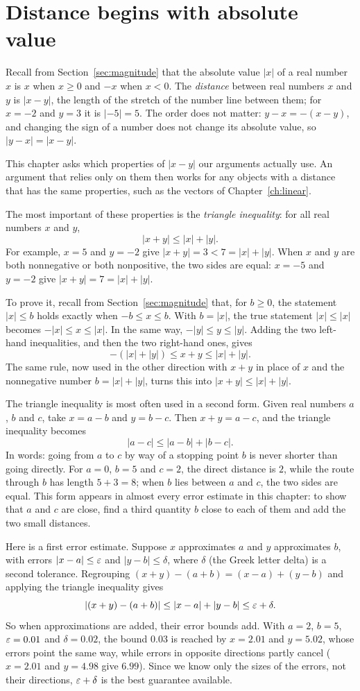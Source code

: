 \section{Distance begins with absolute value}\label{ch11:sec:distance}
Recall from Section~\ref{sec:magnitude} that the absolute value $|x|$ of a real number $x$ is $x$ when $x\ge0$ and $-x$ when $x<0$. The \emph{distance} between real numbers $x$ and $y$ is $|x-y|$, the length of the stretch of the number line between them; for $x=-2$ and $y=3$ it is $|-5|=5$. The order does not matter: $y-x=-(x-y)$, and changing the sign of a number does not change its absolute value, so $|y-x|=|x-y|$.

This chapter asks which properties of $|x-y|$ our arguments actually use. An argument that relies only on them then works for any objects with a distance that has the same properties, such as the vectors of Chapter~\ref{ch:linear}.

The most important of these properties is the \emph{triangle inequality}: for all real numbers $x$ and $y$,
\[
|x+y|\le|x|+|y|.
\]
For example, $x=5$ and $y=-2$ give $|x+y|=3<7=|x|+|y|$. When $x$ and $y$ are both nonnegative or both nonpositive, the two sides are equal: $x=-5$ and $y=-2$ give $|x+y|=7=|x|+|y|$.

To prove it, recall from Section~\ref{sec:magnitude} that, for $b\ge0$, the statement $|x|\le b$ holds exactly when $-b\le x\le b$. With $b=|x|$, the true statement $|x|\le|x|$ becomes $-|x|\le x\le|x|$. In the same way, $-|y|\le y\le|y|$. Adding the two left-hand inequalities, and then the two right-hand ones, gives
\[
-(|x|+|y|)\le x+y\le|x|+|y|.
\]
The same rule, now used in the other direction with $x+y$ in place of $x$ and the nonnegative number $b=|x|+|y|$, turns this into $|x+y|\le|x|+|y|$.

The triangle inequality is most often used in a second form. Given real numbers $a$, $b$ and $c$, take $x=a-b$ and $y=b-c$. Then $x+y=a-c$, and the triangle inequality becomes
\[
|a-c|\le|a-b|+|b-c|.
\]
In words: going from $a$ to $c$ by way of a stopping point $b$ is never shorter than going directly. For $a=0$, $b=5$ and $c=2$, the direct distance is $2$, while the route through $b$ has length $5+3=8$; when $b$ lies between $a$ and $c$, the two sides are equal. This form appears in almost every error estimate in this chapter: to show that $a$ and $c$ are close, find a third quantity $b$ close to each of them and add the two small distances.

Here is a first error estimate. Suppose $x$ approximates $a$ and $y$ approximates $b$, with errors $|x-a|\le\varepsilon$ and $|y-b|\le\delta$, where $\delta$ (the Greek letter delta) is a second tolerance. Regrouping $(x+y)-(a+b)=(x-a)+(y-b)$ and applying the triangle inequality gives
\[
|(x+y)-(a+b)|\le |x-a|+|y-b|\le\varepsilon+\delta.
\]
So when approximations are added, their error bounds add. With $a=2$, $b=5$, $\varepsilon=0.01$ and $\delta=0.02$, the bound $0.03$ is reached by $x=2.01$ and $y=5.02$, whose errors point the same way, while errors in opposite directions partly cancel ($x=2.01$ and $y=4.98$ give $6.99$). Since we know only the sizes of the errors, not their directions, $\varepsilon+\delta$ is the best guarantee available.

